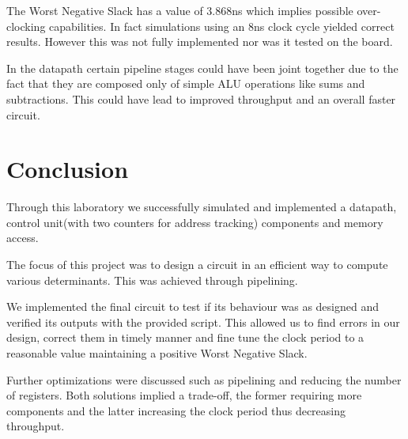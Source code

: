 \documentclass[12pt]{article}
\begin{document}
The Worst Negative Slack has a value of 3.868ns which implies possible over-clocking capabilities. In fact simulations using an 8ns clock cycle yielded correct results. However this was not fully implemented nor was it tested on the board.

In the datapath certain pipeline stages could have been joint together due to the fact that they are composed only of simple ALU operations like sums and subtractions. This could have lead to improved throughput and an overall faster circuit.

\section{Conclusion}
Through this laboratory we successfully simulated and implemented a datapath, control unit(with two counters for address tracking) components and memory access.

The focus of this project was to design a circuit in an efficient way to compute various determinants. This was achieved through pipelining.
  
We implemented the final circuit to test if its behaviour was as designed and verified its outputs with the provided script. This allowed us to
find errors in our design, correct them in timely manner and fine tune the clock period to a reasonable value maintaining a positive Worst Negative Slack.

Further optimizations were discussed such as pipelining and reducing the number of registers. Both solutions implied a trade-off, the former requiring more components and the latter increasing the clock period thus decreasing throughput.

\printbibliography
\end{document}
